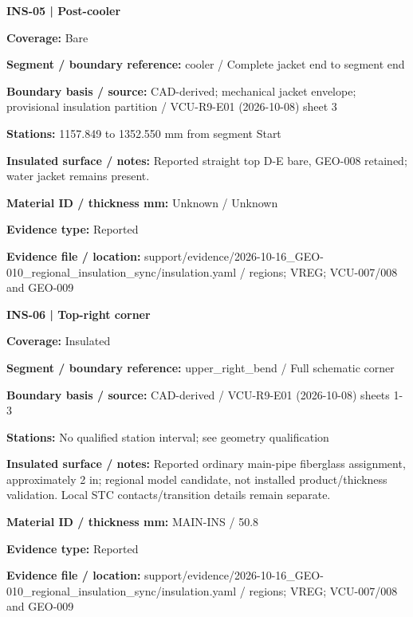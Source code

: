 \documentclass[11pt]{article}
\begin{document}
\par
\par\noindent\begin{minipage}{\textwidth}\small\setlength{\parskip}{2pt}
{\bfseries INS-05 | Post-cooler}\par
\textbf{Coverage:} Bare\par
\textbf{Segment / boundary reference:} cooler / Complete jacket end to segment end\par
\textbf{Boundary basis / source:} CAD-derived; mechanical jacket envelope; provisional insulation partition / VCU-R9-E01 (2026-10-08) sheet 3\par
\textbf{Stations:} 1157.849 to 1352.550 mm from segment Start\par
\textbf{Insulated surface / notes:} Reported straight top D-E bare, GEO-008 retained; water jacket remains present.\par
\textbf{Material ID / thickness mm:} Unknown / Unknown\par
\textbf{Evidence type:} Reported\par
\textbf{Evidence file / location:} support/evidence/2026-10-16\_\allowbreak{}GEO-010\_\allowbreak{}regional\_\allowbreak{}insulation\_\allowbreak{}sync/insulation.yaml / regions; VREG; VCU-007/008 and GEO-009\par
\end{minipage}\par\vspace{5pt}
\par\noindent\begin{minipage}{\textwidth}\small\setlength{\parskip}{2pt}
{\bfseries INS-06 | Top-right corner}\par
\textbf{Coverage:} Insulated\par
\textbf{Segment / boundary reference:} upper\_\allowbreak{}right\_\allowbreak{}bend / Full schematic corner\par
\textbf{Boundary basis / source:} CAD-derived / VCU-R9-E01 (2026-10-08) sheets 1-3\par
\textbf{Stations:} No qualified station interval; see geometry qualification\par
\textbf{Insulated surface / notes:} Reported ordinary main-pipe fiberglass assignment, approximately 2 in; regional model candidate, not installed product/thickness validation. Local STC contacts/transition details remain separate.\par
\textbf{Material ID / thickness mm:} MAIN-INS / 50.8\par
\textbf{Evidence type:} Reported\par
\textbf{Evidence file / location:} support/evidence/2026-10-16\_\allowbreak{}GEO-010\_\allowbreak{}regional\_\allowbreak{}insulation\_\allowbreak{}sync/insulation.yaml / regions; VREG; VCU-007/008 and GEO-009\par
\end{minipage}\par\vspace{5pt}
\end{document}

